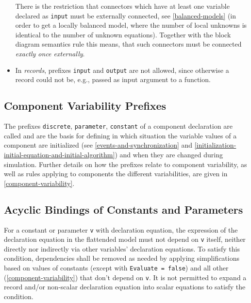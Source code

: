 \begin{itemize}
  There is the restriction that connectors which have at least one variable declared as \lstinline!input! must be externally connected, see \cref{balanced-models} (in order to get a locally balanced model, where the number of local unknowns is identical to the number of unknown equations).
  Together with the block diagram semantics rule this means, that such connectors must be connected \emph{exactly once externally}.
\item
  In \emph{records}, prefixes \lstinline!input! and \lstinline!output! are not allowed, since otherwise a record could not be, e.g., passed as input argument to a function.
\end{itemize}


\subsection{Component Variability Prefixes}\label{component-variability-prefixes-discrete-parameter-constant}

The prefixes \lstinline!discrete!, \lstinline!parameter!, \lstinline!constant! of a component declaration are called  and are the basis for defining in which situation the variable values of a component are initialized (see \cref{events-and-synchronization} and \cref{initialization-initial-equation-and-initial-algorithm}) and when they are changed during simulation.
Further details on how the prefixes relate to component variability, as well as rules applying to components the different variabilities, are given in \cref{component-variability}.


\subsection{Acyclic Bindings of Constants and Parameters}\label{acyclic-bindings-of-constants-and-parameters}

For a constant or parameter \lstinline!v! with declaration equation, the expression of the declaration equation in the flattended model must not depend on \lstinline!v! itself, neither directly nor indirectly via other variables' declaration equations.
To satisfy this condition, dependencies shall be removed as needed by applying simplifications based on values of constants (except with \lstinline!Evaluate = false!) and all other  (\cref{component-variability}) that don't depend on \lstinline!v!.
It is not permitted to expand a record and/or non-scalar declaration equation into scalar equations to satisfy the condition.

